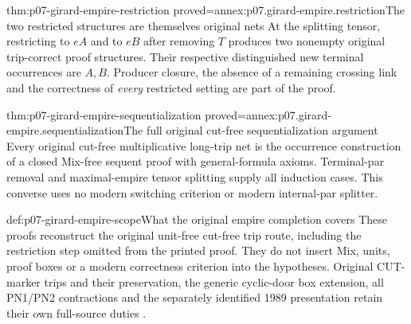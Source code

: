 \begin{hblemma}{thm:p07-girard-empire-restriction}
 {proved=annex:p07.girard-empire.restriction}{The two restricted structures are themselves original nets}
At the splitting tensor, restricting to \(eA\) and to \(eB\)
after removing \(T\) produces two nonempty original trip-correct
proof structures. Their respective distinguished new terminal
occurrences are \(A,B\). Producer closure, the absence of a remaining
crossing link and the correctness of \emph{every} restricted setting
are part of the proof.
\end{hblemma}

\begin{hbtheorem}{thm:p07-girard-empire-sequentialization}
 {proved=annex:p07.girard-empire.sequentialization}{The full original cut-free sequentialization argument}
Every original cut-free multiplicative long-trip net is the occurrence
construction of a closed Mix-free sequent proof with general-formula
axioms. Terminal-par removal and maximal-empire tensor splitting
supply all induction cases. This converse uses no modern switching
criterion or modern internal-par splitter.
\end{hbtheorem}

\begin{proofboundary}{def:p07-girard-empire-scope}{What the original empire completion covers}
These proofs reconstruct the original unit-free cut-free trip route,
including the restriction step omitted from the printed proof.
They do not insert Mix, units, proof boxes or a modern correctness
criterion into the hypotheses. Original CUT-marker trips and their
preservation, the generic cyclic-door box extension, all PN1/PN2
contractions and the separately identified 1989 presentation retain
their own full-source duties \cite[pp.~40--47]{Girard1987AuthorHosted}.
\end{proofboundary}
